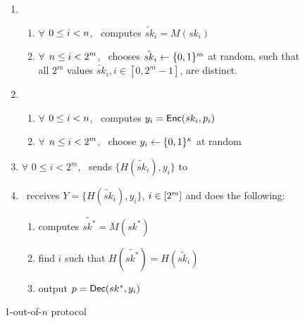 \begin{figure}[h]
{\begin{minipage}{0.95\linewidth}
\begin{enumerate}
				\item 
				\begin{enumerate}
					\item $\forall$ $0\leq i < n$, \SS\ computes $\tilde{sk}_{i} = M(sk_i)$
					\item $\forall$ $n \leq i < 2^m$, \SS\ chooses $\tilde{sk}_{i} \leftarrow\{0,1\}^m$ at random, such that all $2^m$ values $\tilde{sk}_{i}, i \in [0, 2^m-1]$, are distinct.				
				\end{enumerate}
				\item  
				\begin{enumerate}
					\item $\forall$ $0\leq i < n$, \SS\ computes $y_i = \mathsf{Enc}(sk_i, p_i)$
					\item $\forall$ $n \leq i < 2^m$, \SS\ choose $y_i \leftarrow\{0,1\}^\kappa$ at random
				\end{enumerate}
				\item $\forall$ $0\leq i < 2^m$, \SS\ sends $\{H(\tilde{sk}_{i}), y_i\}$ to \RR\
				
				\item \RR\ receives $Y=\{H(\tilde{sk}_{i}), y_i\}$, $i\in[2^{m}]$ and does the following: 
				\begin{enumerate}
					\item computes $\tilde{sk^*} = M(sk^*)$
					\item find $i$ such that $H(\tilde{sk^*})= H(\tilde{sk_i})$
					\item output $p=\mathsf{Dec}(sk^*, y_i)$
				\end{enumerate}				
				
			\end{enumerate}				
		\end{minipage}
	}
	\caption{1-out-of-$n$ \SSOT protocol}
	\label{fig:Cons1ssot}
\end{figure}


